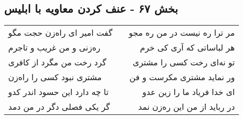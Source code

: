 \begin{center}
\section*{بخش ۶۷ - عنف کردن معاویه با ابلیس}
\label{sec:sh067}
\begin{longtable}{l p{0.5cm} r}
گفت امیر ای راه‌زن حجت مگو
&&
مر ترا ره نیست در من ره مجو
\\
ره‌زنی و من غریب و تاجرم
&&
هر لباساتی که آری کی خرم
\\
گرد رخت من مگرد از کافری
&&
تو نه‌ای رخت کسی را مشتری
\\
مشتری نبود کسی را راه‌زن
&&
ور نماید مشتری مکرست و فن
\\
تا چه دارد این حسود اندر کدو
&&
ای خدا فریاد ما را زین عدو
\\
گر یکی فصلی دگر در من دمد
&&
در رباید از من این ره‌زن نمد
\\
\end{longtable}
\end{center}
